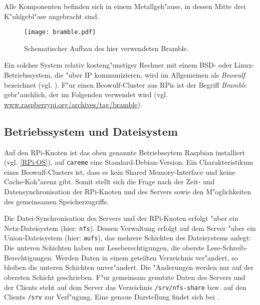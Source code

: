 Alle Komponenten befinden sich in einem Metallgeh"ause, in dessen Mitte drei K"uhlgebl"ase angebracht sind. 
\begin{figure}[htb]
	\centering
	\texttt{[image: bramble.pdf]}\\ 
	\caption{Schematischer Aufbau des hier verwendeten Bramble.}\label{fig:Bramble}
\end{figure}
Ein solches System relativ kosteng"unstiger Rechner mit einem BSD- oder Linux-Betriebs\-system, die "uber IP kommunizieren, wird im Allgemeinen als \textit{Beowulf} bezeichnet (vgl. \cite{kie01}). F"ur einen Beowulf-Cluster aus RPis ist der Begriff \textit{Bramble} gebr"auchlich, der im Folgenden verwendet wird (vgl. \url{www.raspberrypi.org/archives/tag/bramble}). 
 
\subsection{Betriebssystem und Dateisystem}\label{Bramble-Architektur} 

Auf den RPi-Knoten ist das oben genannte Betriebssytem Raspbian installiert (vgl. \ref{RPi-OS}), auf \texttt{careme} eine Standard-Debian-Version. Ein Charakteristikum eines Beowulf-Clusters ist, dass es kein Shared Memory-Interface und keine Cache-Koh"arenz gibt. Somit stellt sich die Frage nach der Zeit- und Datensynchronisation der RPi-Knoten und des Servers sowie den M"oglichkeiten des gemeinsamen Speicherzugriffs. 

Die Datei-Synchronisation des Servers und der RPi-Knoten erfolgt "uber ein Netz-Dateisys\-tem (hier: \texttt{nfs}). Dessen Verwaltung erfolgt auf dem Server "uber ein Union-Dateisystem (hier: \texttt{aufs}), das mehrere Schichten des Dateisystems anlegt: Die unteren Schichten haben nur Leseberechtigungen, die oberste Lese-Schreib-Berechtigungen. Werden Daten in einem geteilten Verzeichnis ver"andert, so bleiben die unteren Schichten unver"andert. Die "Anderungen werden nur auf der obersten Schicht geschrieben. F"ur gemeinsam genutzte Daten des Servers und der Clients steht auf dem Server das Verzeichnis \texttt{/srv/nfs-share} bzw. auf den Clients \texttt{/srv} zur Verf"ugung. Eine genaue Darstellung findet sich bei \cite{kli13}.

